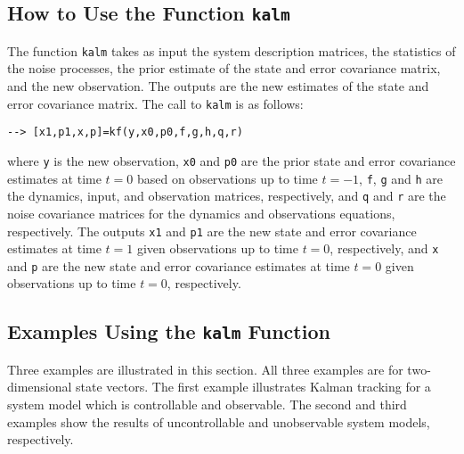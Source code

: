 \subsection{How to Use the Function {\tt kalm}}

	The function {\tt kalm} takes as input the system description
matrices, the statistics of the noise processes, the prior estimate of 
the state and error covariance matrix, and the new observation.  The
outputs are the new estimates of the state and error covariance
matrix.  The call to {\tt kalm} is as follows:
\begin{verbatim}
--> [x1,p1,x,p]=kf(y,x0,p0,f,g,h,q,r)
\end{verbatim}
where {\tt y} is the new observation, {\tt x0} and {\tt p0} are the
prior state and error covariance estimates at time $t=0$ based on observations
up to time $t=-1$, {\tt f}, {\tt g} and {\tt h} are
the dynamics, input, and observation matrices, respectively, and {\tt q} 
and {\tt r} are the noise covariance matrices for the dynamics and
observations equations, respectively.  The outputs {\tt x1} and {\tt p1}
are the new state and error covariance estimates at time $t=1$ given
observations up to time $t=0$, respectively, and {\tt x} and {\tt p}
are the new state and error covariance estimates at time $t=0$ given
observations up to time $t=0$, respectively.

\subsection{Examples Using the {\tt kalm} Function}

	Three examples are illustrated in this section.  All three
examples are for two-dimensional state vectors.  The first example
illustrates Kalman tracking for a system model which is controllable
and observable.  The second and third examples show the results of
uncontrollable and unobservable system models, respectively. 

